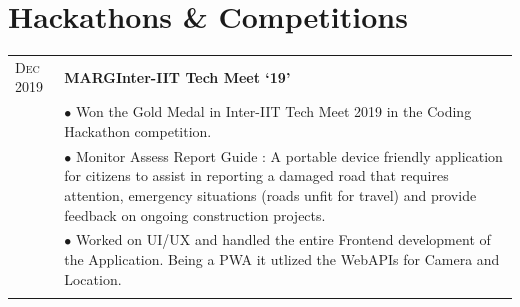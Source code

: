 \documentclass[a4paper,12pt]{extarticle} %
\let\oldtextbf\textbf
\renewcommand{\textbf}[1]{\textcolor{bold}{\oldtextbf{#1}}}
\begin{document}
\section{\textcolor{primary}{Hackathons \& Competitions}}

\begin{tabularx}{\linewidth}{ l | X }

  \textsc{Dec 2019}
   & \textbf{MARG}\hfill\textbf{Inter-IIT Tech Meet `19'}                                                                                                        \\

   & {$\bullet$ Won the Gold Medal in Inter-IIT Tech Meet 2019 in the Coding Hackathon competition.}                                                             \\

   & {$\bullet$ Monitor Assess Report Guide : A portable device friendly application for citizens to assist in reporting a damaged road that requires attention,
      emergency situations (roads unfit for travel) and provide feedback on ongoing construction projects.
    }                                                                                                                                                            \\
   & {$\bullet$ Worked on UI/UX and handled the entire Frontend development of the Application. Being a PWA it utlized the WebAPIs for Camera and Location.}     \\

  \multicolumn{2}{c}{}                                                                                                                                           \\



\end{tabularx}
\end{document}
